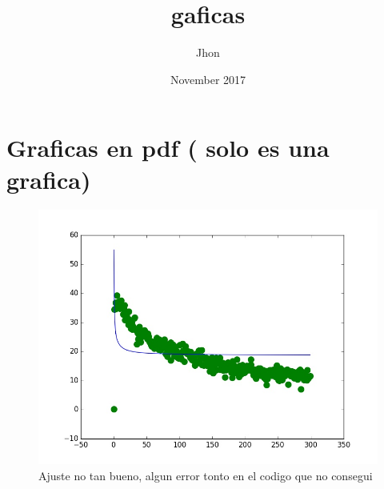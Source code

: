 \documentclass{article}
\title{gaficas}
\author{Jhon}
\date{November 2017}
\begin{document}
\maketitle

\section{Graficas en pdf ( solo es una grafica) }


\begin{figure}[hf!]
\centering
\includegraphics[scale=0.5]{Plots.jpg}
\caption{Ajuste no tan bueno, algun error tonto en el codigo que no consegui }
\label{fig:1}
\end{figure}









\end{document}
